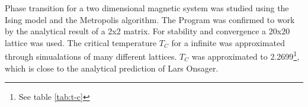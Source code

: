 Phase transition for a two dimensional magnetic system was studied using the Ising model and the Metropolis algorithm. The Program was confirmed to work by the analytical result of a 2x2 matrix. For stability and convergence a 20x20 lattice was used. The critical temperature $T_C$ for a infinite was approximated through simualations of many different lattices. $T_C$ was approximated to 2.2699\footnote{See table \ref{tab:t-c}}, which is close to the analytical prediction of Lars Onsager.\cite{onsager} 